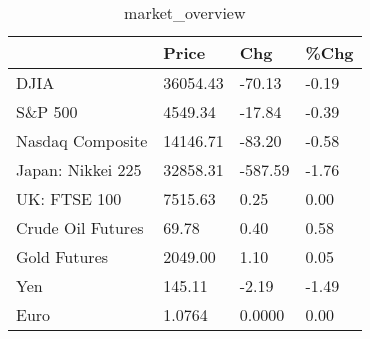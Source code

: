 \documentclass{article}%
\begin{document}
%


\begin{table}[htbp]%
\caption{market\_overview}%
\centering%
\begin{adjustbox}{width=1\textwidth}%
\begin{tabular}{llll}
\toprule
                  &    Price &     Chg &  \%Chg \\
\midrule
             DJIA & 36054.43 &  -70.13 & -0.19 \\
          S\&P 500 &  4549.34 &  -17.84 & -0.39 \\
 Nasdaq Composite & 14146.71 &  -83.20 & -0.58 \\
Japan: Nikkei 225 & 32858.31 & -587.59 & -1.76 \\
     UK: FTSE 100 &  7515.63 &    0.25 &  0.00 \\
Crude Oil Futures &    69.78 &    0.40 &  0.58 \\
     Gold Futures &  2049.00 &    1.10 &  0.05 \\
              Yen &   145.11 &   -2.19 & -1.49 \\
             Euro &   1.0764 &  0.0000 &  0.00 \\
\bottomrule
\end{tabular}
%
\end{adjustbox}%
\end{table}

%
\end{document}
